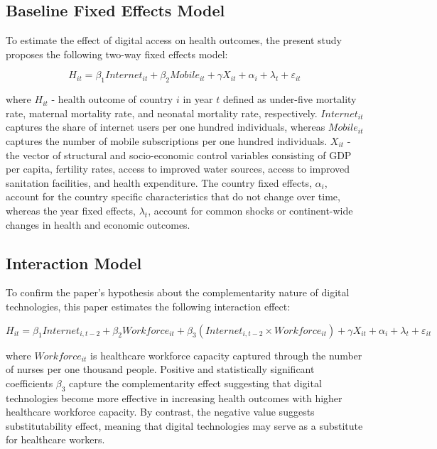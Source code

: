 \documentclass[12pt]{article}
\begin{document}
\subsection{Baseline Fixed Effects Model}

To estimate the effect of digital access on health outcomes, the present study proposes the following two-way fixed effects model:

\begin{equation}
H_{it} = \beta_1 Internet_{it} + \beta_2 Mobile_{it} + \gamma X_{it} + \alpha_i + \lambda_t + \varepsilon_{it}
\label{eq:baseline}
\end{equation}

where $H_{it}$ - health outcome of country $i$ in year $t$ defined as under-five mortality rate, maternal mortality rate, and neonatal mortality rate, respectively. $Internet_{it}$ captures the share of internet users per one hundred individuals, whereas $Mobile_{it}$ captures the number of mobile subscriptions per one hundred individuals. $X_{it}$ - the vector of structural and socio-economic control variables consisting of GDP per capita, fertility rates, access to improved water sources, access to improved sanitation facilities, and health expenditure. The country fixed effects, $\alpha_i$, account for the country specific characteristics that do not change over time, whereas the year fixed effects, $\lambda_t$, account for common shocks or continent-wide changes in health and economic outcomes.

\subsection{Interaction Model}

To confirm the paper’s hypothesis about the complementarity nature of digital technologies, this paper estimates the following interaction effect:

\begin{equation}
H_{it} =
\beta_1 Internet_{i,t-2}
+
\beta_2 Workforce_{it}
+
\beta_3 (Internet_{i,t-2} \times Workforce_{it})
+
\gamma X_{it}
+
\alpha_i
+
\lambda_t
+
\varepsilon_{it}
\label{eq:interaction}
\end{equation}

where $Workforce_{it}$ is healthcare workforce capacity captured through the number of nurses per one thousand people. Positive and statistically significant coefficients $\beta_3$ capture the complementarity effect suggesting that digital technologies become more effective in increasing health outcomes with higher healthcare workforce capacity. By contrast, the negative value suggests substitutability effect, meaning that digital technologies may serve as a substitute for healthcare workers.
\end{document}
